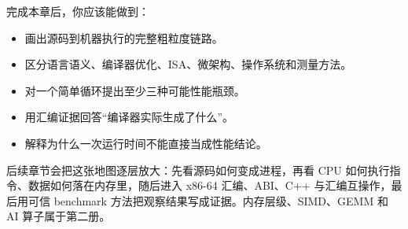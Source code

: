 完成本章后，你应该能做到：

\begin{itemize}
  \item 画出源码到机器执行的完整粗粒度链路。
  \item 区分语言语义、编译器优化、ISA、微架构、操作系统和测量方法。
  \item 对一个简单循环提出至少三种可能性能瓶颈。
  \item 用汇编证据回答“编译器实际生成了什么”。
  \item 解释为什么一次运行时间不能直接当成性能结论。
\end{itemize}

后续章节会把这张地图逐层放大：先看源码如何变成进程，再看 CPU 如何执行指令、数据如何落在内存里，随后进入 x86-64 汇编、ABI、C++ 与汇编互操作，最后用可信 benchmark 方法把观察结果写成证据。内存层级、SIMD、GEMM 和 AI 算子属于第二册。
